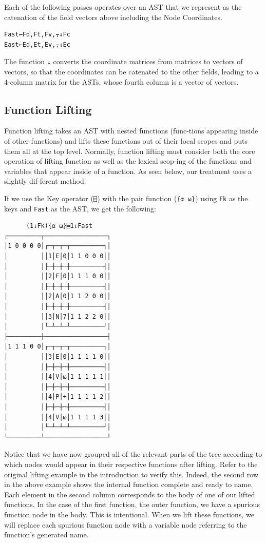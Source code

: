 ﻿\documentclass[numbers,10pt,preprint]{sigplanconf}
\begin{document}
Each of the following passes operates over an AST that we represent as the catenation of the field vectors above including the Node Coordinates.

\begin{verbatim}
Fast←Fd,Ft,Fv,⍪↓Fc
East←Ed,Et,Ev,⍪↓Ec
\end{verbatim}

\noindent The function \verb;↓; converts the coordinate matrices from matrices to vectors of vectors, so that the coordinates can be catenated to the other fields, leading to a 4-column matrix for the ASTs, whose fourth column is a vector of vectors. 

\subsection{Function Lifting}

Function lifting takes an AST with nested functions (func-tions appearing inside of other functions) and lifts these functions out of their local scopes and puts them all at the top level. Normally, function lifting must consider both the core operation of lifting function as well as the lexical scop-ing of the functions and variables that appear inside of a function. As seen below, our treatment uses a slightly dif-ferent method. 

If we use the Key operator (\verb;⌸;) with the pair function (\verb;{⍺ ⍵};) using \verb;Fk; as the keys and \verb;Fast; as the AST, we get the following:

\begin{verbatim}
      (1↓Fk){⍺ ⍵}⌸1↓Fast
┌─────────┬─────────────────┐
│1 0 0 0 0│┌─┬─┬─┬─────────┐│
│         ││1│E│0│1 1 0 0 0││
│         │├─┼─┼─┼─────────┤│
│         ││2│F│0│1 1 1 0 0││
│         │├─┼─┼─┼─────────┤│
│         ││2│A│0│1 1 2 0 0││
│         │├─┼─┼─┼─────────┤│
│         ││3│N│7│1 1 2 2 0││
│         │└─┴─┴─┴─────────┘│
├─────────┼─────────────────┤
│1 1 1 0 0│┌─┬─┬─┬─────────┐│
│         ││3│E│0│1 1 1 1 0││
│         │├─┼─┼─┼─────────┤│
│         ││4│V│⍵│1 1 1 1 1││
│         │├─┼─┼─┼─────────┤│
│         ││4│P│+│1 1 1 1 2││
│         │├─┼─┼─┼─────────┤│
│         ││4│V│⍵│1 1 1 1 3││
│         │└─┴─┴─┴─────────┘│
└─────────┴─────────────────┘
\end{verbatim}

Notice that we have now grouped all of the relevant parts of the tree according to which nodes would appear in their respective functions after lifting. Refer to the original lifting example in the introduction to verify this. Indeed, the second row in the above example shows the internal function complete and ready to name. Each element in the second column corresponds to the body of one of our lifted functions. In the case of the first function, the outer function, we have a spurious function node in the body. This is intentional. When we lift these functions, we will replace each spurious function node with a variable node referring to the function’s generated name.
\end{document}
